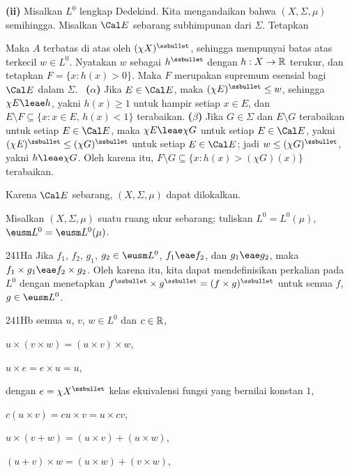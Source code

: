 {\medskip

{\bf (ii)} Misalkan $L^0$ lengkap Dedekind. Kita mengandaikan bahwa
$(X,\Sigma,\mu)$ semihingga. Misalkan $\Cal E$ sebarang subhimpunan
dari $\Sigma$. Tetapkan


\noindent Maka $A$ terbatas di atas oleh $(\chi X)^{\ssbullet}$,
sehingga mempunyai batas atas terkecil $w\in L^0$. Nyatakan $w$ sebagai
$h^{\ssbullet}$ dengan $h:X\to\Bbb R$ terukur, dan tetapkan
$F=\{x:h(x)>0\}$. Maka $F$ merupakan supremum esensial bagi $\Cal E$
dalam $\Sigma$. \Prf\ {\bf (${\alpha}$)} Jika $E\in\Cal E$, maka
$(\chi E)^{\ssbullet}\le w$, sehingga $\chi E\leae h$, yakni
$h(x)\ge 1$ untuk hampir setiap $x\in E$, dan
$E\setminus F\subseteq\{x:x\in E,\,h(x)<1\}$ terabaikan.
{\bf (${\beta}$)} Jika $G\in\Sigma$ dan $E\setminus G$ terabaikan untuk
setiap $E\in\Cal E$, maka $\chi E\leae\chi G$ untuk setiap
$E\in\Cal E$, yakni $(\chi E)^{\ssbullet}\le(\chi G)^{\ssbullet}$
untuk setiap $E\in\Cal E$; jadi $w\le(\chi G)^{\ssbullet}$, yakni
$h\leae\chi G$. Oleh karena itu,
$F\setminus G\subseteq\{x:h(x)>(\chi G)(x)\}$ terabaikan.\ \Qed

Karena $\Cal E$ sebarang, $(X,\Sigma,\mu)$ dapat dilokalkan.
}%

 Misalkan $(X,\Sigma,\mu)$ suatu
ruang ukur sebarang; tuliskan $L^0=L^0(\mu)$,
$\eusm L^0=\eusm L^0(\mu)$.

\spheader 241Ha Jika $f_1$, $f_2$, $g_1$, $g_2\in\eusm L^0$,
$f_1\eae f_2$, dan $g_1\eae g_2$, maka
$f_1\times g_1\eae f_2\times g_2$. Oleh karena itu, kita dapat
mendefinisikan perkalian pada $L^0$ dengan menetapkan
$f^{\ssbullet}\times g^{\ssbullet}=(f\times g)^{\ssbullet}$ untuk semua
$f$, $g\in\eusm L^0$.

\spheader 241Hb semua
$u$, $v$, $w\in L^0$ dan $c\in\Bbb R$,

\qquad $u\times(v\times w)=(u\times v)\times w$,

\qquad $u\times e=e\times u=u$,

\noindent dengan $e=\chi X^{\ssbullet}$ kelas ekuivalensi fungsi yang
bernilai konstan $1$,

\qquad $c(u\times v)=cu\times v=u\times cv$,

\qquad $u\times(v+w)=(u\times v)+(u\times w)$,

\qquad $(u+v)\times w=(u\times w)+(v\times w)$,

